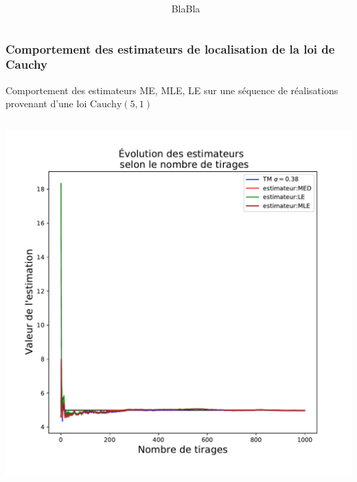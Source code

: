 \documentclass[8pt, sans]{beamer}
\begin{document}
\begin{frame}
\begin{columns}[T]
\begin{column}{0.5\linewidth}
\end{column}

\pause

\begin{column}{0.5\linewidth}

BlaBla
\end{column}

\end{columns}


\end{frame}

\begin{frame}

\frametitle{Comportement des estimateurs de localisation de la loi de Cauchy }
Comportement des estimateurs ME, MLE, LE sur une séquence de réalisations provenant d'une loi $\mathrm{Cauchy}(5,1)$

\pause

\begin{columns}[T] %

\begin{column}{0.5\linewidth}

\includegraphics[scale=0.2]{Est-1000.pdf}

\end{column}

\pause
\hfill


\end{columns}
\end{frame}
\end{document}
